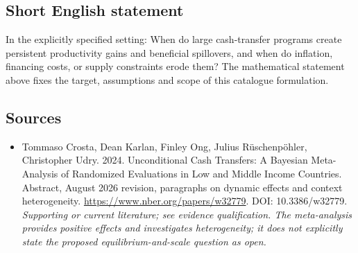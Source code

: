 \documentclass[11pt]{article}
\begin{document}
\subsection{Short English statement}
In the explicitly specified setting: When do large cash-transfer programs create persistent productivity gains and beneficial spillovers, and when do inflation, financing costs, or supply constraints erode them? The mathematical statement above fixes the target, assumptions and scope of this catalogue formulation.

\subsection{Sources}
\begin{itemize}\raggedright
\item[\textnormal{[S1]}]\hypertarget{source:30007654:1}{} Tommaso Crosta, Dean Karlan, Finley Ong, Julius Rüschenpöhler, Christopher Udry. 2024. Unconditional Cash Transfers: A Bayesian Meta-Analysis of Randomized Evaluations in Low and Middle Income Countries. Abstract, August 2026 revision, paragraphs on dynamic effects and context heterogeneity.
\url{https://www.nber.org/papers/w32779}.
DOI: 10.3386/w32779.
{\small\textit{Supporting or current literature; see evidence qualification. The meta-analysis provides positive effects and investigates heterogeneity; it does not explicitly state the proposed equilibrium-and-scale question as open.}}
\end{itemize}
\end{document}
